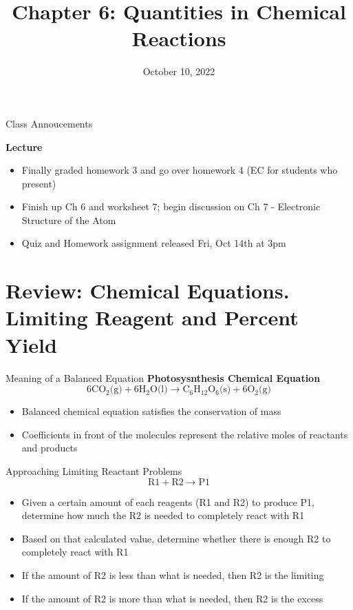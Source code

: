\documentclass[11pt]{beamer}
\title{Chapter 6: Quantities in Chemical Reactions}
\institute{Chemistry Department, Cypress College}
\date{October 10, 2022}
\begin{document}
\begin{frame}
  \titlepage
\end{frame}

\begin{frame}{Class Annoucements}
  
  \textbf{Lecture}
  \begin{itemize}
  \item Finally graded homework 3 and go over homework 4 (EC for
    students who present)
  \item Finish up Ch 6 and worksheet 7; begin discussion on Ch 7
    - Electronic Structure of the Atom
  \item Quiz and Homework assignment released Fri, Oct 14th at 3pm
  \end{itemize}
\end{frame}

\section{Review: Chemical Equations. Limiting Reagent and Percent Yield}

\begin{frame}{Meaning of a Balanced Equation}
  \textbf{Photosysnthesis Chemical Equation}
  \begin{equation}
    6\text{CO$_2$(g)} + 6\text{H$_2$O(l)} \rightarrow \text{C$_6$H$_{12}$O$_6$(s)}
    + 6\text{O$_2$(g)}
  \end{equation}
  
  \begin{itemize}
  \item Balanced chemical equation satisfies the conservation of mass
  \item Coefficients in front of the molecules represent the relative
    moles of reactants and products
  \end{itemize}
\end{frame}

\begin{frame}{Approaching Limiting Reactant Problems}
  \begin{equation}
    \text{R1} + \text{R2} \rightarrow \text{P1}
  \end{equation}
  \begin{itemize}
  \item Given a certain amount of each reagents (R1 and R2)
    to produce P1, determine
    how much the R2 is needed to completely react with R1
  \item Based on that calculated value, determine whether
    there is enough R2 to completely react with R1
  \item If the amount of R2 is less than what is needed,
    then R2 is the limiting
  \item If the amount of R2 is more than what is needed,
    then R2 is the excess
  \end{itemize}
\end{frame}
\end{document}
